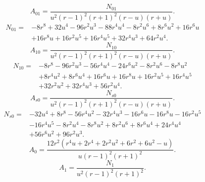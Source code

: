 \begin{equation}
A_{01}=\frac{N_{01}}{u^{2} \left(r - 1\right)^{2} \left(r + 1\right)^{2} \left(r - u\right) \left(r + u\right)}.
\end{equation}
\begin{equation}
\begin{aligned}
N_{01}={}& - 8 r^{8} + 32 u^{4} - 96 r^{2} u^{3} - 88 r^{4} u^{4} - 8 r^{2} u^{6} + 8 r^{6} u^{2} + 16 r^{6} u\\
& + 16 r^{8} u + 16 r^{2} u^{5} + 16 r^{4} u^{5} + 32 r^{4} u^{3} + 64 r^{2} u^{4}.
\end{aligned}
\end{equation}
\begin{equation}
A_{10}=\frac{N_{10}}{u^{2} \left(r - 1\right)^{2} \left(r + 1\right)^{2} \left(r - u\right) \left(r + u\right)}.
\end{equation}
\begin{equation}
\begin{aligned}
N_{10}={}& - 8 r^{8} - 96 r^{2} u^{3} - 56 r^{4} u^{4} - 24 r^{6} u^{2} - 8 r^{2} u^{6} - 8 r^{8} u^{2}\\
& + 8 r^{4} u^{2} + 8 r^{6} u^{4} + 16 r^{6} u + 16 r^{8} u + 16 r^{2} u^{5} + 16 r^{4} u^{5}\\
& + 32 r^{2} u^{2} + 32 r^{4} u^{3} + 56 r^{2} u^{4}.
\end{aligned}
\end{equation}
\begin{equation}
A_{s0}=\frac{N_{s0}}{u^{2} \left(r - 1\right)^{2} \left(r + 1\right)^{2} \left(r - u\right) \left(r + u\right)}.
\end{equation}
\begin{equation}
\begin{aligned}
N_{s0}={}& - 32 u^{4} + 8 r^{8} - 56 r^{4} u^{2} - 32 r^{4} u^{3} - 16 r^{6} u - 16 r^{8} u - 16 r^{2} u^{5}\\
& - 16 r^{4} u^{5} - 8 r^{2} u^{4} - 8 r^{8} u^{2} + 8 r^{2} u^{6} + 8 r^{6} u^{4} + 24 r^{4} u^{4}\\
& + 56 r^{6} u^{2} + 96 r^{2} u^{3}.
\end{aligned}
\end{equation}
\begin{equation}
A_{0}=\frac{12 r^{2} \left(r^{4} u + 2 r^{4} + 2 r^{2} u^{2} + 6 r^{2} + 6 u^{2} - u\right)}{u \left(r - 1\right)^{2} \left(r + 1\right)^{2}}.
\end{equation}
\begin{equation}
A_{1}=\frac{N_{1}}{u^{2} \left(r - 1\right)^{2} \left(r + 1\right)^{2}}.
\end{equation}
